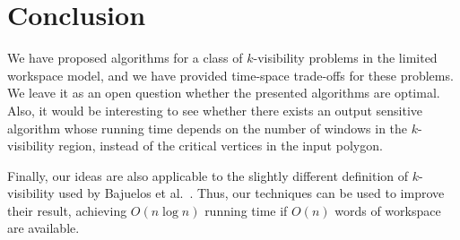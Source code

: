 \documentclass[11pt, a4paper]{article}
\begin{document}
\section{Conclusion}
We have proposed algorithms for a class of $k$-visibility problems 
in the limited workspace model, and we have provided time-space 
trade-offs for these problems. We leave it as an open question 
whether the presented algorithms are optimal. Also, it 
would be interesting to see whether there exists an output sensitive 
algorithm whose running time depends on the number of windows in 
the $k$-visibility region, instead of the critical vertices in the input polygon.

Finally, our ideas are also applicable to the slightly
different definition of $k$-visibility used by Bajuelos et 
al.~\cite{bajuelos2012hybrid}. Thus, our techniques can be used to 
improve their result, achieving $O(n \log n)$ running time if 
$O(n)$ words of workspace are available.



\end{document}
